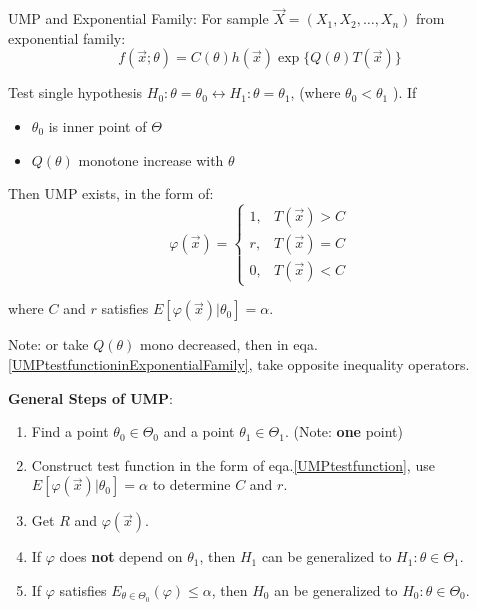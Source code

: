     UMP and Exponential Family: For sample $\vec{X}=(X_1,X_2,\dots,X_n)$ from exponential family:
    \[
    f(\vec{x};\theta)=C(\theta)h(\vec{x})\exp\{Q(\theta)T(\vec{x})\}    
    \]

    Test single hypothesis $H_0:\theta=\theta_0\longleftrightarrow H_1:\theta=\theta_1$, (where $ \theta_0<\theta_1 $ ).
    If 
    \begin{itemize}[topsep=0.5pt,itemsep=0pt]
        \item $\theta_0$ is inner point of $\Theta$
        \item $Q(\theta)$  monotone increase with $\theta$
    \end{itemize}

    Then UMP exists, in the form of:
    \begin{equation}\label{UMPtestfunctioninExponentialFamily}
            \varphi(\vec{x})=\begin{cases}
        1,&T(\vec{x})>C\\
        r,&T(\vec{x})=C\\
        0,&T(\vec{x})<C
    \end{cases} 
    \end{equation}
   
    

    where $C$ and $r$ satisfies $E[\varphi(\vec{x})|\theta_0]=\alpha$.

    Note: or take $Q(\theta)$ mono decreased, then in eqa.\ref{UMPtestfunctioninExponentialFamily}, take opposite inequality operators.
    
\begin{point}
    \textbf{General Steps of UMP}:
\end{point}

    
    \begin{enumerate}
        \item Find a point $\theta_0\in\Theta_0$ and a point $\theta_1\in\Theta_1$. (Note: \textbf{one} point)
        \item Construct test function in the form of eqa.\hyperref[UMPtestfunction]{\ref{UMPtestfunction}}, use $E[\varphi(\vec{x})|\theta_0]=\alpha$ to determine $C$ and $r$.
        \item Get $R$ and $\varphi(\vec{x})$.
        \item If $\varphi$ does \textbf{not} depend on $\theta_1$, then $H_1$ can be generalized to $H_1:\theta\in\Theta_1$.
        \item If $\varphi$ satisfies $E_{\theta\in\Theta_0}(\varphi)\leq\alpha$, then $H_0$ an be generalized to $H_0:\theta\in\Theta_0$.
    \end{enumerate}

